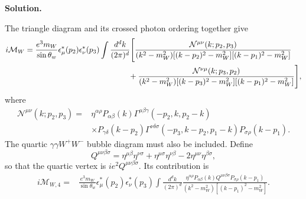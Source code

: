 \documentclass[a4paper,11pt]{article}
\newenvironment{solution}{\par\medskip\noindent\textbf{Solution.}\par\smallskip}{\par\medskip}
\begin{document}
\begin{solution}
The triangle diagram and its crossed photon ordering together give
\begin{equation}
\begin{aligned}
i\mathcal M_{W}
={}&
\frac{e^3m_W}{\sin\theta_w}
\epsilon_\mu^*(p_2)\epsilon_\nu^*(p_3)
\int\frac{d^dk}{(2\pi)^d}
\Bigg[
\frac{\mathcal N^{\mu\nu}(k;p_2,p_3)}
     {(k^2-m_W^2)
      [(k-p_2)^2-m_W^2]
      [(k-p_1)^2-m_W^2]}
\\
&\hspace{4.2cm}
+
\frac{\mathcal N^{\nu\mu}(k;p_3,p_2)}
     {(k^2-m_W^2)
      [(k-p_3)^2-m_W^2]
      [(k-p_1)^2-m_W^2]}
\Bigg],
\end{aligned}
\end{equation}
where
\begin{equation}
\begin{aligned}
\mathcal N^{\mu\nu}(k;p_2,p_3)
={}&
\eta^{\alpha\rho}
P_{\alpha\beta}(k)
\Gamma^{\mu\beta\gamma}
    (-p_2,k,p_2-k)
\\
&\times
P_{\gamma\delta}(k-p_2)
\Gamma^{\nu\delta\sigma}
    (-p_3,k-p_2,p_1-k)
P_{\sigma\rho}(k-p_1).
\end{aligned}
\end{equation}
The quartic $\gamma\gamma W^+W^-$ bubble diagram
must also be included. Define
\begin{equation}
    Q^{\mu\nu\beta\sigma}
    =
    \eta^{\mu\beta}\eta^{\nu\sigma}
    +\eta^{\mu\sigma}\eta^{\nu\beta}
    -2\eta^{\mu\nu}\eta^{\beta\sigma},
\end{equation}
so that the quartic vertex is $ie^2Q^{\mu\nu\beta\sigma}$.
Its contribution is
\begin{equation}
\begin{aligned}
i\mathcal M_{W,4}
={}&
\frac{e^3m_W}{\sin\theta_w}
\epsilon_\mu^*(p_2)\epsilon_\nu^*(p_3)
\int\frac{d^dk}{(2\pi)^d}
\frac{
\eta^{\alpha\rho}
P_{\alpha\beta}(k)
Q^{\mu\nu\beta\sigma}
P_{\sigma\rho}(k-p_1)
}{
(k^2-m_W^2)[(k-p_1)^2-m_W^2]
}.
\end{aligned}
\end{equation}


\end{solution}
\end{document}
